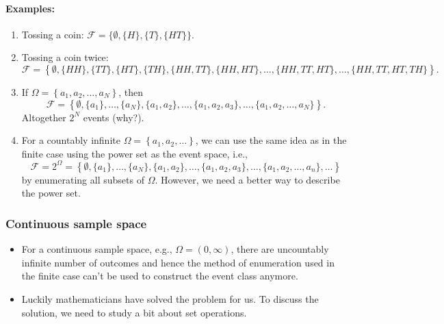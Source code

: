 \paragraph{Examples:}
\begin{enumerate}
\item Tossing a coin: \(\mathcal{F} =\{\emptyset,\{H\},\{T\},\{H T\}\}\).
\item Tossing a coin twice:  
\begin{equation*}
\mathcal{F} = \left\{\emptyset,\{H H\},\{T T\},\{H T\},\{T H\},
 \{H H, T T\},\{H H, H T\}, \ldots, 
\{H H, T T, H T\}, \ldots,\{H H, T T, H T, T H\} \right\}.
\end{equation*}
\item If \( \Omega=\left\{a_{1}, a_{2}, \ldots, a_{N}\right\}\), then 
\begin{equation*}
\mathcal{F}=\left\{\emptyset,\{a_{1}\},
\ldots,\{a_{N}\}, \{a_{1}, a_{2}\},
\ldots,\{a_{1}, a_{2}, a_{3}\}, \ldots,
\{a_{1}, a_{2}, \ldots, a_{N}\}\right\}.
\end{equation*}
Altogether \(2^{N}\) events (why?).

\item For a countably infinite  \( \Omega = \left\{a_{1}, a_{2},
\ldots \right\}\), we can use the same idea as in the finite case
using the power set as the event space, i.e., 
\begin{equation*}
\mathcal{F} = 2^{\Omega} = \left\{\emptyset,\{a_{1}\},
\ldots,\{a_{N}\}, \{a_{1}, a_{2}\},
\ldots,\{a_{1}, a_{2}, a_{3}\}, \ldots,
\{a_{1}, a_{2}, \ldots, a_{n}\}, \ldots \right\}
\end{equation*}
by enumerating all subsets of \(\Omega\). However, we need a better
way to describe the power set.
\end{enumerate}

\subsubsection{Continuous sample space}
\begin{itemize}
\item For a continuous sample space, e.g., \(\Omega = (0,\infty)\),
there are uncountably infinite number of outcomes and hence the method
of enumeration used in the finite case can't be used to construct the
event class anymore.
\item Luckily mathematicians have solved the problem for us. To
discuss the solution, we need to study a bit about set operations.
\end{itemize}

